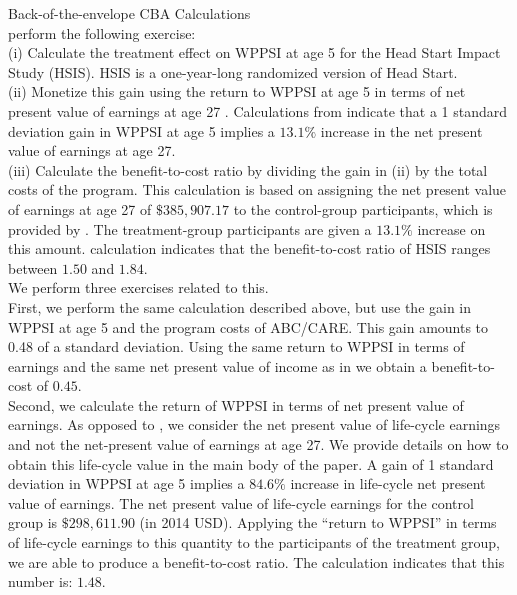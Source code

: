 



\doublespacing

\noindent Back-of-the-envelope CBA Calculations \\

\noindent \citet{Kline-Walters_2016_QJE} perform the following exercise:\\

\noindent (i)  Calculate the treatment effect on WPPSI at age 5 for the Head Start Impact Study (HSIS). HSIS is a one-year-long randomized version of Head Start.\\

\noindent (ii) Monetize this gain using the return to WPPSI at age 5 in terms of net present value of earnings at age 27 \citep{Chetty_Friedman_etal_2010_HowDoesYour}. Calculations from \citet{Chetty_Friedman_etal_2010_HowDoesYour} indicate that a 1 standard deviation gain in WPPSI at age 5 implies a $13.1\%$ increase in the net present value of earnings at age 27.\\

\noindent (iii) Calculate the benefit-to-cost ratio by dividing the gain in (ii) by the total costs of the program. This calculation is based on assigning the net present value of earnings at age 27 of $\$385,907.17$ to the control-group participants, which is provided by \citet{Chetty_Friedman_etal_2010_HowDoesYour}. The treatment-group participants are given a $13.1\%$ increase on this amount. \citet{Kline-Walters_2016_QJE} calculation indicates that the benefit-to-cost ratio of HSIS ranges between $1.50$ and $1.84$.\\ 

\noindent We perform three exercises related to this.\\

\noindent First, we perform the same calculation described above, but use the gain in WPPSI at age 5 and the program costs of ABC/CARE. This gain amounts to 0.48 of a standard deviation. Using the same return to WPPSI in terms of earnings and the same net present value of income as in\citet{Chetty_Friedman_etal_2010_HowDoesYour} we obtain a benefit-to-cost of $0.45$.\\

\noindent Second, we calculate the return of WPPSI in terms of net present value of earnings. As opposed to \citet{Chetty_Friedman_etal_2010_HowDoesYour}, we consider the net present value of life-cycle earnings and not the net-present value of earnings at age 27. We provide details on how to obtain this life-cycle value in the main body of the paper. A gain of 1 standard deviation in WPPSI at age 5 implies a $84.6\%$ increase in life-cycle net present value of earnings. The net present value of life-cycle earnings for the control group is $\$298,611.90$ (in 2014 USD). Applying the ``return to WPPSI'' in terms of life-cycle earnings to this quantity to the participants of the treatment group, we are able to produce a benefit-to-cost ratio. The calculation indicates that this number is: $1.48$.\\

